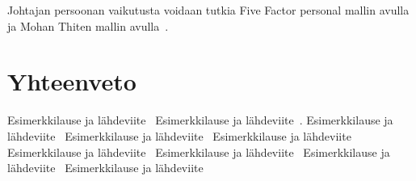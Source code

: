 \documentclass[finnish]{tktltiki2}
\theoremstyle{definition}
\theoremstyle{remark}
\begin{document}
Johtajan persoonan vaikutusta voidaan tutkia Five Factor personal mallin avulla ja Mohan Thiten mallin avulla~\cite{Wang:2009:PMP:1639950.1640049}. 


\section{Yhteenveto}







 






Esimerkkilause ja lähdeviite~\cite{McLeod:2011:FAS:1978802.1978803}
Esimerkkilause ja lähdeviite~\cite{Guo:2008:SSP:1414004.1414046}.
Esimerkkilause ja lähdeviite~\cite{Luther:2008:LOC:1460563.1460619}
Esimerkkilause ja lähdeviite~\cite{Zhang:2011:ECL:2047594.2047666}
Esimerkkilause ja lähdeviite~\cite{Dhomne:2012:ITL:2382887.2382899}
Esimerkkilause ja lähdeviite~\cite{1385637}
Esimerkkilause ja lähdeviite~\cite{bahli2005group}
Esimerkkilause ja lähdeviite~\cite{Augustine:2005:APM:1101779.1101781}
Esimerkkilause ja lähdeviite~\cite{Chow2008961}






%
%
% 
%



\end{document}
